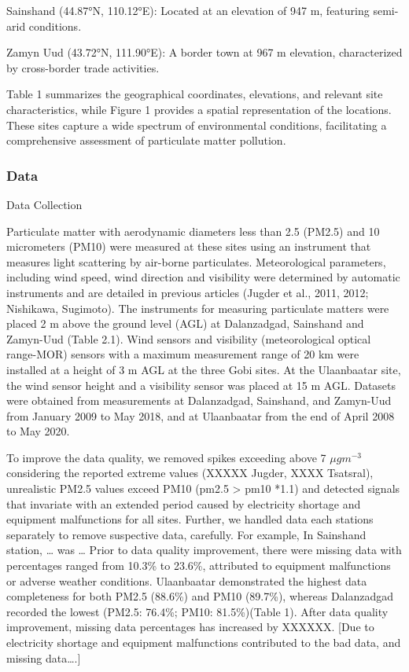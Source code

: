 \documentclass[
  11pt,
]{article}
\begin{document}
Sainshand (44.87°N, 110.12°E): Located at an elevation of 947 m,
featuring semi-arid conditions.

Zamyn Uud (43.72°N, 111.90°E): A border town at 967 m elevation,
characterized by cross-border trade activities.

Table 1 summarizes the geographical coordinates, elevations, and
relevant site characteristics, while Figure 1 provides a spatial
representation of the locations. These sites capture a wide spectrum of
environmental conditions, facilitating a comprehensive assessment of
particulate matter pollution.

\subsubsection{Data}\label{data}

Data Collection

Particulate matter with aerodynamic diameters less than 2.5 (PM2.5) and
10 micrometers (PM10) were measured at these sites using an instrument
that measures light scattering by air-borne particulates. Meteorological
parameters, including wind speed, wind direction and visibility were
determined by automatic instruments and are detailed in previous
articles (Jugder et al., 2011, 2012; Nishikawa, Sugimoto). The
instruments for measuring particulate matters were placed 2 m above the
ground level (AGL) at Dalanzadgad, Sainshand and Zamyn-Uud (Table 2.1).
Wind sensors and visibility (meteorological optical range-MOR) sensors
with a maximum measurement range of 20 km were installed at a height of
3 m AGL at the three Gobi sites. At the Ulaanbaatar site, the wind
sensor height and a visibility sensor was placed at 15 m AGL. Datasets
were obtained from measurements at Dalanzadgad, Sainshand, and Zamyn-Uud
from January 2009 to May 2018, and at Ulaanbaatar from the end of April
2008 to May 2020.

To improve the data quality, we removed spikes exceeding above 7
\(\mu g m^{-3}\) considering the reported extreme values (XXXXX Jugder,
XXXX Tsatsral), unrealistic PM2.5 values exceed PM10 (pm2.5
\textgreater{} pm10 *1.1) and detected signals that invariate with an
extended period caused by electricity shortage and equipment
malfunctions for all sites. Further, we handled data each stations
separately to remove suspective data, carefully. For example, In
Sainshand station, \ldots{} was \ldots{} Prior to data quality
improvement, there were missing data with percentages ranged from 10.3\%
to 23.6\%, attributed to equipment malfunctions or adverse weather
conditions. Ulaanbaatar demonstrated the highest data completeness for
both PM2.5 (88.6\%) and PM10 (89.7\%), whereas Dalanzadgad recorded the
lowest (PM2.5: 76.4\%; PM10: 81.5\%)(Table 1). After data quality
improvement, missing data percentages has increased by XXXXXX. {[}Due to
electricity shortage and equipment malfunctions contributed to the bad
data, and missing data\ldots.{]}
\end{document}
